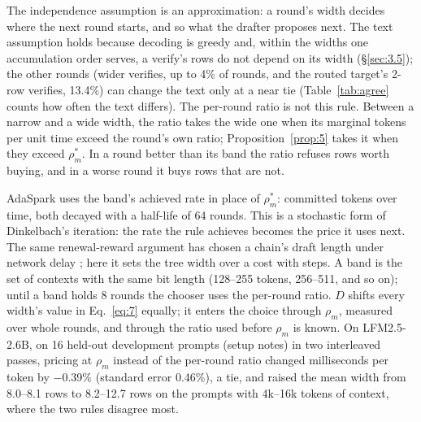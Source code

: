 \documentclass[10pt,twocolumn,letterpaper]{article}
\begin{document}
The independence assumption is an approximation: a round's width decides where the next round starts, and so what the drafter proposes next. The text assumption holds because decoding is greedy and, within the widths one accumulation order serves, a verify's rows do not depend on its width (\S\ref{sec:3.5}); the other rounds (wider verifies, up to 4\% of rounds, and the routed target's 2-row verifies, 13.4\%) can change the text only at a near tie (Table~\ref{tab:agree} counts how often the text differs). The per-round ratio is not this rule. Between a narrow and a wide width, the ratio takes the wide one when its marginal tokens per unit time exceed the round's own ratio; Proposition~\ref{prop:5} takes it when they exceed $\rho_{m}^{*}$. In a round better than its band the ratio refuses rows worth buying, and in a worse round it buys rows that are not.

AdaSpark uses the band's achieved rate in place of $\rho_{m}^{*}$: committed tokens over time, both decayed with a half-life of 64 rounds. This is a stochastic form of Dinkelbach's iteration: the rate the rule achieves becomes the price it uses next. The same renewal-reward argument has chosen a chain's draft length under network delay \cite{sun2026delay}; here it sets the tree width over a cost with steps. A band is the set of contexts with the same bit length (128--255 tokens, 256--511, and so on); until a band holds 8 rounds the chooser uses the per-round ratio. $D$ shifts every width's value in Eq.~\eqref{eq:7} equally; it enters the choice through $\rho_{m}$, measured over whole rounds, and through the ratio used before $\rho_{m}$ is known. On LFM2.5-2.6B, on 16 held-out development prompts (setup notes) in two interleaved passes, pricing at $\rho_{m}$ instead of the per-round ratio changed milliseconds per token by $-$0.39\% (standard error 0.46\%), a tie, and raised the mean width from 8.0--8.1 rows to 8.2--12.7 rows on the prompts with 4k--16k tokens of context, where the two rules disagree most.
\end{document}

